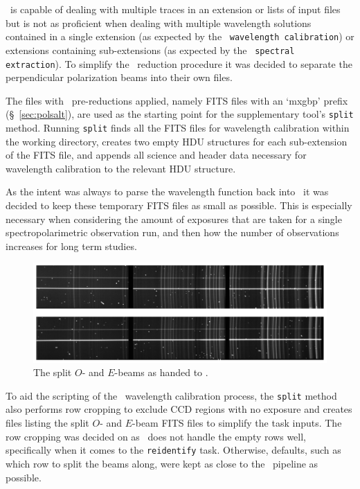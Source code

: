 \iraf\ is capable of dealing with multiple traces in an extension or lists of input files but is not as proficient when dealing with multiple wavelength solutions contained in a single extension (as expected by the \polsalt\ \texttt{wavelength calibration}) or extensions containing sub-extensions (as expected by the \polsalt\ \texttt{spectral extraction}). To simplify the \iraf\ reduction procedure it was decided to separate the perpendicular polarization beams into their own files.

The files with \polsalt\ pre-reductions applied, namely \gls{FITS} files with an `mxgbp' prefix (\S~\ref{sec:polsalt}), are used as the starting point for the supplementary tool's \texttt{split} method. Running \texttt{split} finds all the \gls{FITS} files for wavelength calibration within the working directory, creates two empty \gls{HDU} structures for each sub-extension of the \gls{FITS} file, and appends all science and header data necessary for wavelength calibration to the relevant \gls{HDU} structure.

As the intent was always to parse the wavelength function back into \polsalt\ it was decided to keep these temporary \gls{FITS} files as small as possible. This is especially necessary when considering the amount of exposures that are taken for a single spectropolarimetric observation run, and then how the number of observations increases for long term studies.

\begin{figure}[t]
    \centering
    \includegraphics[width = 1.0\textwidth]{figures/3_OEsplit.pdf}
    \caption{The split $O$- and $E$-beams as handed to \iraf.}
    \label{fig:OE_split}
\end{figure}

To aid the scripting of the \iraf\ wavelength calibration process, the \texttt{split} method also performs row cropping to exclude \gls{CCD} regions with no exposure and creates files listing the split $O$- and $E$-beam \gls{FITS} files to simplify the task inputs. The row cropping was decided on as \iraf\ does not handle the empty rows well, specifically when it comes to the \texttt{reidentify} task. Otherwise, defaults, such as which row to split the beams along, were kept as close to the \polsalt\ pipeline as possible.

